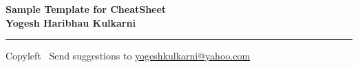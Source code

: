
\graphicspath{{images/}}

\footnotesize


\begin{center}
\Large{\textbf{Sample Template for CheatSheet\\ Yogesh Haribhau Kulkarni}}  
\end{center}

\begin{multicols}{2}

\end{multicols}

\rule{\linewidth}{0.25pt}
\scriptsize
Copyleft \textcopyleft\  Send suggestions to 
\href{http://www.yogeshkulkarni.com}{yogeshkulkarni@yahoo.com}


